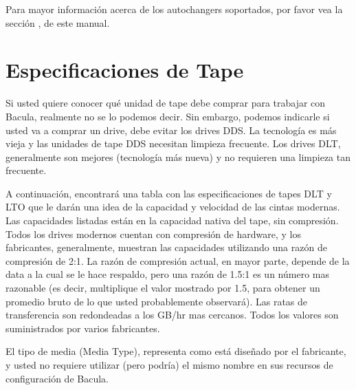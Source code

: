 Para mayor información acerca de los autochangers soportados, por favor vea la sección
, de este manual.

\section{Especificaciones de Tape}

Si usted quiere conocer qué unidad de tape debe comprar para trabajar con Bacula,
realmente no se lo podemos decir. Sin embargo, podemos indicarle si usted va a comprar
un drive, debe evitar los drives DDS. La tecnología es más vieja y las unidades de
tape DDS necesitan limpieza frecuente. Los drives DLT, generalmente son mejores (tecnología
más nueva) y no requieren una limpieza tan frecuente.

A continuación, encontrará una tabla con las especificaciones de tapes DLT y LTO
que le darán una idea de la capacidad y velocidad de las cintas modernas. Las capacidades
listadas están en la capacidad nativa del tape, sin compresión. Todos los drives
modernos cuentan con compresión de hardware, y los fabricantes, generalmente, muestran
las capacidades utilizando una razón de compresión de 2:1. La razón de compresión
actual, en mayor parte, depende de la data a la cual se le hace respaldo, pero una
razón de 1.5:1 es un número mas razonable (es decir, multiplique el valor mostrado
por 1.5, para obtener un promedio bruto de lo que usted probablemente observará).
Las ratas de transferencia son redondeadas a los GB/hr mas cercanos. Todos los
valores son suministrados por varios fabricantes.

El tipo de media (Media Type), representa como está diseñado por el fabricante, y
usted no requiere utilizar (pero podría) el mismo nombre en sus recursos de configuración
de Bacula.

